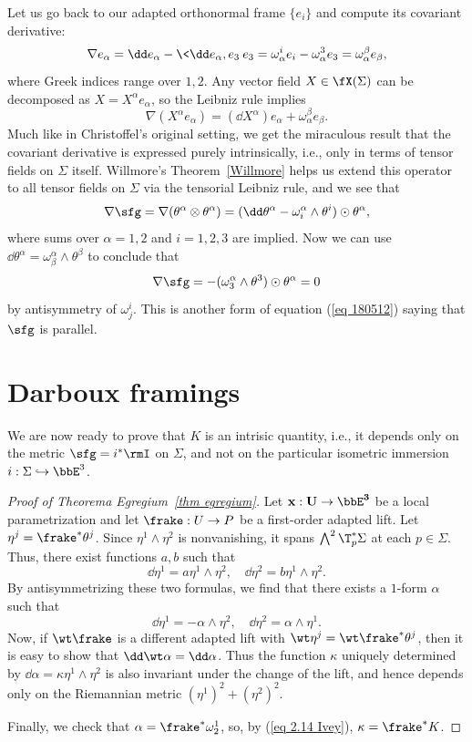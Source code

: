 \begin{rem}
    Let us go back to our adapted orthonormal frame $\{e_i\}$ and compute its covariant derivative:
    \[\nabla e_\alpha=\dd e_\alpha-\<\dd e_\alpha,e_3\>e_3=\omega^i_\alpha e_i-\omega^3_\alpha e_3=\omega^\beta_\alpha e_\beta,\]
    where Greek indices range over $1,2$. Any vector field $X\in\fX(\Sigma)$ can be decomposed as $X=X^\alpha e_\alpha$, so the Leibniz rule implies 
    \[\nabla(X^\alpha e_\alpha)=(\dd X^\alpha)e_\alpha+\omega^\beta_\alpha e_\beta.\]
    Much like in Christoffel's original setting, we get the miraculous result that the covariant derivative is expressed purely intrinsically, i.e., only in terms of tensor fields on $\Sigma$ itself.
    Willmore's Theorem~\ref{Willmore} helps us extend this operator to all tensor fields on $\Sigma$ via the tensorial Leibniz rule, and we see that
    \[\nabla\sfg=\nabla(\theta^\alpha\otimes \theta^\alpha)=(\dd \theta^\alpha-\omega^\alpha_i\wedge \theta^i)\odot \theta^\alpha,\]
    where sums over $\alpha=1,2$ and $i=1,2,3$ are implied. Now we can use $\dd\theta^\alpha=\omega^\alpha_\beta\wedge\theta^\beta$ to conclude that 
    \[\nabla\sfg=-(\omega^\alpha_3\wedge\theta^3)\odot \theta^\alpha=0\]
    by antisymmetry of $\omega^i_j$. This is another form of equation (\ref{eq 180512}) saying that $\sfg$ is parallel.
\end{rem}








\section{Darboux framings}\label{sec: principal framings}

We are now ready to prove that $K$ is an intrisic quantity, i.e., it depends only on the metric $\sfg=i^\ast\rmI$ on $\Sigma$, and not on the particular isometric immersion $i:\Sigma\hookrightarrow \bbE^3$.

\begin{proof}[Proof of Theorema Egregium~\ref{thm egregium}]
    Let $\bf{x}:U\to \bbE^3$ be a local parametrization and let $\frake:U\to P$ be a first-order adapted lift. Let $\eta^j=\frake^\ast\theta^j$. Since $\eta^1\wedge\eta^2$ is nonvanishing, it spans $\bigwedge^2 \T_p^\ast\Sigma$ at each $p\in\Sigma$. Thus, there exist functions $a,b$ such that 
    \[\dd\eta^1=a\eta^1\wedge\eta^2,\quad \dd\eta^2=b\eta^1\wedge \eta^2.\]
    By antisymmetrizing these two formulas, we find that there exists a $1$-form $\alpha$ such that 
    \[\dd\eta^1=-\alpha\wedge\eta^2,\quad \dd\eta^2=\alpha\wedge\eta^1.\]
    Now, if $\wt\frake$ is a different adapted lift with $\wt\eta^j=\wt\frake^\ast\theta^j$, then it is easy to show that $\dd\wt\alpha=\dd\alpha$. Thus the function $\kappa$ uniquely determined by $\dd\alpha=\kappa\eta^1\wedge\eta^2$ is also invariant under the change of the lift, and hence depends only on the Riemannian metric $(\eta^1)^2+(\eta^2)^2$.

    Finally, we check that $\alpha=\frake^\ast\omega_2^1$, so, by (\ref{eq 2.14 Ivey}), $\kappa=\frake^\ast K$.
\end{proof}

